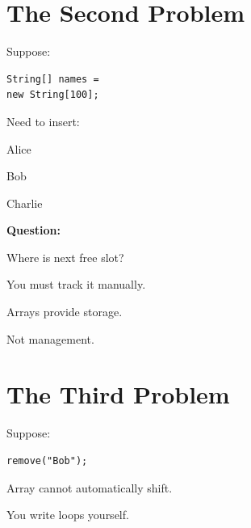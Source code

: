 \documentclass[11pt,a4paper]{book}
\begin{document}

\section{The Second Problem}

Suppose:

\begin{verbatim} 
String[] names =
new String[100];
\end{verbatim}


Need to insert:


Alice

Bob

Charlie


\textbf{Question:}

Where is next free slot?


You must track it manually.


Arrays provide storage.


Not management.


\section{The Third Problem}

Suppose:

\begin{verbatim} 
remove("Bob");
\end{verbatim}


Array cannot automatically shift.


You write loops yourself.

\end{document}
